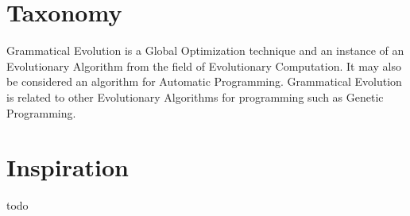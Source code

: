 \documentclass[a4paper, 11pt]{article}
\begin{document}
\section{Taxonomy}
\label{sec:taxonomy}
Grammatical Evolution is a Global Optimization technique and an instance of an Evolutionary Algorithm from the field of Evolutionary Computation. It may also be considered an algorithm for Automatic Programming.
Grammatical Evolution is related to other Evolutionary Algorithms for programming such as Genetic Programming.

\section{Inspiration}
\label{sec:inspiration}
todo

\end{document}
